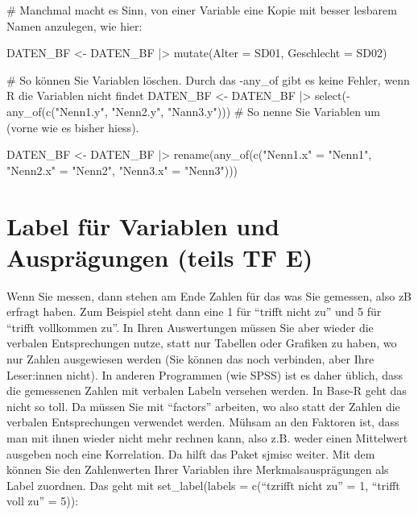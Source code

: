 \documentclass[twoside, pagesize, fontsize=11pt, dvipsnames]{scrreport}
\newenvironment{Shaded}{\begin{snugshade}}{\end{snugshade}}
\newcommand{\AttributeTok}[1]{\textcolor[rgb]{0.40,0.45,0.13}{#1}}
\newcommand{\CommentTok}[1]{\textcolor[rgb]{0.37,0.37,0.37}{#1}}
\newcommand{\FunctionTok}[1]{\textcolor[rgb]{0.28,0.35,0.67}{#1}}
\newcommand{\NormalTok}[1]{\textcolor[rgb]{0.00,0.23,0.31}{#1}}
\newcommand{\OtherTok}[1]{\textcolor[rgb]{0.00,0.23,0.31}{#1}}
\newcommand{\SpecialCharTok}[1]{\textcolor[rgb]{0.37,0.37,0.37}{#1}}
\newcommand{\StringTok}[1]{\textcolor[rgb]{0.13,0.47,0.30}{#1}}
\begin{document}
\begin{Shaded}
\begin{Highlighting}[]
\CommentTok{\# Manchmal macht es Sinn, von einer Variable eine Kopie mit besser lesbarem Namen anzulegen, wie hier:}

\NormalTok{DATEN\_BF }\OtherTok{\textless{}{-}}\NormalTok{ DATEN\_BF }\SpecialCharTok{|\textgreater{}} 
  \FunctionTok{mutate}\NormalTok{(}\AttributeTok{Alter =}\NormalTok{ SD01,}
         \AttributeTok{Geschlecht =}\NormalTok{ SD02)}

\CommentTok{\# So können Sie Variablen löschen. Durch das {-}any\_of gibt es keine Fehler, wenn R die Variablen nicht findet}
\NormalTok{DATEN\_BF }\OtherTok{\textless{}{-}}\NormalTok{ DATEN\_BF }\SpecialCharTok{|\textgreater{}} 
  \FunctionTok{select}\NormalTok{(}\SpecialCharTok{{-}}\FunctionTok{any\_of}\NormalTok{(}\FunctionTok{c}\NormalTok{(}\StringTok{"Nenn1.y"}\NormalTok{, }\StringTok{"Nenn2.y"}\NormalTok{, }\StringTok{"Nann3.y"}\NormalTok{)))}
\CommentTok{\# So nenne Sie Variablen um (vorne wie es bisher hiess).}

\NormalTok{DATEN\_BF }\OtherTok{\textless{}{-}}\NormalTok{ DATEN\_BF }\SpecialCharTok{|\textgreater{}} 
  \FunctionTok{rename}\NormalTok{(}\FunctionTok{any\_of}\NormalTok{(}\FunctionTok{c}\NormalTok{(}\StringTok{"Nenn1.x"} \OtherTok{=} \StringTok{"Nenn1"}\NormalTok{, }\StringTok{"Nenn2.x"} \OtherTok{=} \StringTok{"Nenn2"}\NormalTok{, }\StringTok{"Nenn3.x"} \OtherTok{=} \StringTok{"Nenn3"}\NormalTok{))) }
\end{Highlighting}
\end{Shaded}

\hypertarget{label-fuxfcr-variablen-und-auspruxe4gungen-teils-tf-e}{%
\section{Label für Variablen und Ausprägungen (teils TF
E)}\label{label-fuxfcr-variablen-und-auspruxe4gungen-teils-tf-e}}

Wenn Sie messen, dann stehen am Ende Zahlen für das was Sie gemessen,
also zB erfragt haben. Zum Beispiel steht dann eine 1 für
\enquote{trifft nicht zu} und 5 für \enquote{trifft vollkommen zu}. In
Ihren Auswertungen müssen Sie aber wieder die verbalen Entsprechungen
nutze, statt nur Tabellen oder Grafiken zu haben, wo nur Zahlen
ausgewiesen werden (Sie können das noch verbinden, aber Ihre Leser:innen
nicht). In anderen Programmen (wie SPSS) ist es daher üblich, dass die
gemessenen Zahlen mit verbalen Labeln versehen werden. In Base-R geht
das nicht so toll. Da müssen Sie mit \enquote{factors} arbeiten, wo also
statt der Zahlen die verbalen Entsprechungen verwendet werden. Mühsam an
den Faktoren ist, dass man mit ihnen wieder nicht mehr rechnen kann,
also z.B. weder einen Mittelwert ausgeben noch eine Korrelation. Da
hilft das Paket sjmisc weiter. Mit dem können Sie den Zahlenwerten Ihrer
Variablen ihre Merkmalsausprägungen als Label zuordnen. Das geht mit
set\_label(labels = c(\enquote{tzrifft nicht zu} = 1, \enquote{trifft
voll zu} = 5)):
\end{document}
